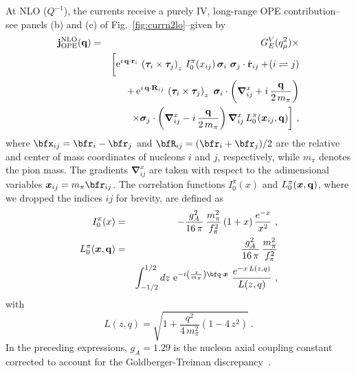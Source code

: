 \documentclass[aps,prc,floatfix,showpacs,twocolumn, preprintnumbers]{revtex4-2}
\begin{document}
At NLO ($Q^{-1}$), the currents receive a purely IV, long-range OPE contribution--see panels (b) and (c) of Fig.~\ref{fig:currn2lo}--given by 
\begin{eqnarray}
{\bf j}^{\rm NLO}_{\rm OPE}({\bf q})&=& G^V_E(q_{\mu}^2) \times \\
&& \bigg[ {\rm e}^{i\,{\bf q}\cdot {\bf r}_i}\,
 \left({\bm \tau}_i \times {\bm \tau}_j\right)_z
\, I_0^\pi(x_{ij}) \, {\bm \sigma}_i \,\, {\bm \sigma}_j \cdot \hat{\bf r}_{ij}+\! (i \rightleftharpoons j)  \nonumber \\
&&+\, {\rm e}^{i\,{\bf q}\cdot {\bf R}_{ij}}\, \left({\bm \tau}_i \times {\bm \tau}_j\right)_z\, 
 \,{\bm \sigma}_i \cdot \left({\bm \nabla}^x_{ij} + i\, \frac{\bf q}{2\, m_\pi}\right) \nonumber\\
&&\times {\bm \sigma}_j \cdot \left({\bm \nabla}_{ij}^x -i\, \frac{\bf q}{2\, m_\pi}\right)
 {\bm \nabla}^x_{ij}\, L_0^\pi({\bm x}_{ij},{\bf q})\bigg] \ ,
\label{eq:nlor2}
\end{eqnarray}
where $\bfx_{ij}=\bfr_{i}-\bfr_{j}$ and $\bfR_{ij}=(\bfr_i+\bfr_j)/2$ are the relative and center of mass coordinates of nucleons $i$ and $j$, respectively, while $m_\pi$ denotes the pion mass. The gradients ${\bm \nabla}^x_{ij}$ are taken with respect to the adimensional variables ${\bm x}_{ij}=m_{\pi}\bfr_{ij}$.  The correlation functions
$I_0^\pi (x)$ and $L_0^\pi({\bm x},{\bf q})$, where we dropped the indices $ij$ for brevity, are defined as
\begin{eqnarray}
\label{eq:e12}
I_0^\pi (x)&=& -\frac{g^2_A}{16\, \pi}\, \frac{m_\pi^2}{f_\pi^2}\, (1+x)\, \frac{e^{-x}}{x^2} \ ,\\
\label{eq:e11} \nonumber
L_0^{\pi}({\bm x},{\bf q}) &=&\frac{g^2_A}{16\, \pi}\, \frac{m_\pi^2}{f_\pi^2} \\
&&\int_{-1/2}^{1/2} dz\,\,
 {\rm e}^{-i\left(\frac{z}{m_\pi}\right)\bfq \cdot {\bm x}} \,\, \frac{e^{-x \, L(z,q)}}{ L(z,q)} \ , 
\end{eqnarray}
with
\begin{equation}
 L(z,q)=\sqrt{1+\frac{q^2}{4\, m_\pi^2}\left(1-4\, z^2\right)} \ .
 \end{equation}
In the preceding expressions, $g_A=1.29$ is the nucleon axial coupling constant corrected to account for the Goldberger-Treiman discrepancy~\cite{Arndt:1994bu,Stoks:1992ja}.
 
\end{document}
